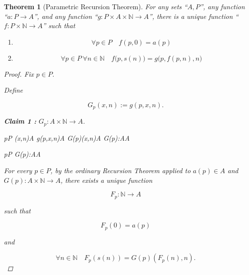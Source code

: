 \documentclass[10pt,a4paper]{book}
\newtheorem{theorem}{Theorem}[section]
\begin{document}
\begin{theorem}[Parametric Recursion Theorem]
    For any sets ``$A,P$'', any function ``$a:P\to A$'', and any function
    ``$g:P\times A\times \mathbb{N}\to A$'', there is a unique function
    ``$f:P\times\mathbb{N}\to A$'' such that
    \begin{enumerate}
        \setlength{\itemsep}{0pt}

        \item
              \[
                  \forall p\in P \quad f(p,0)=a(p)
              \]

        \item
              \[
                  \forall p\in P \ \forall n\in\mathbb{N}
                  \quad
                  f\big(p,s(n)\big)=g\big(p,f(p,n),n\big)
              \]
    \end{enumerate}

    \begin{proof}

        Fix $p\in P$.

        Define

        \[
            G_p(x,n):=g(p,x,n).
        \]

        \textbf{Claim 1 :}
        $G_p:A\times\mathbb{N}\to A$.

        \begin{fitchproof}[arrayenv=tabular]

            \open
             {p\in P}
            \open
             {(x,n)\in A\times{}}
             {g(p,x,n)\in A}
             {G(p)(x,n)\in A}
            \close
             {G(p):A\times{}\to A}
            \close

             {\forall p\in P
                \quad
                G(p):A\times{}\to A}

        \end{fitchproof}

        \medskip

        For every $p\in P$, by the ordinary Recursion Theorem applied to $a(p)\in A$
        and $G(p):A\times\mathbb{N}\to A$, there exists a unique function

        \[
            F_p:\mathbb{N}\to A
        \]

        such that

        \[
            F_p(0)=a(p)
        \]

        and

        \[
            \forall n\in\mathbb{N}
            \quad
            F_p(s(n))
            =
            G(p)(F_p(n),n).
        \]


\end{proof}
\end{theorem}
\end{document}
